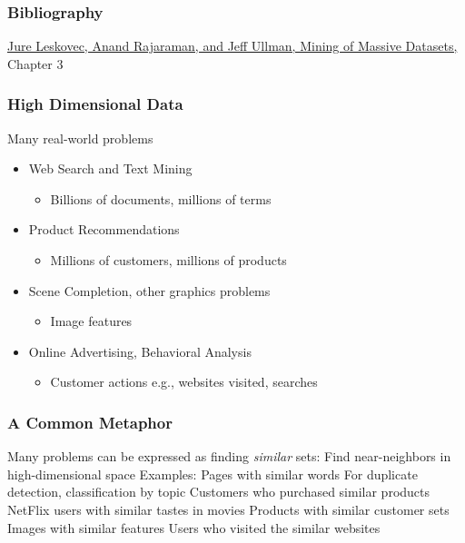 \documentclass[svgnames]{beamer}
\subtitle{Similarity Search}
\begin{document}
\maketitle
\makeoutline

\begin{frame}
    \frametitle{Bibliography}
    \href{http://www.mmds.org}{Jure Leskovec, Anand Rajaraman, and Jeff Ullman, Mining of Massive Datasets,} Chapter 3
\end{frame}

\begin{frame} \frametitle{High Dimensional Data}
Many real-world problems
\begin{itemize}
\item Web Search and Text Mining
  \begin{itemize}
  \item Billions of documents, millions of terms
  \end{itemize}
\item Product Recommendations
  \begin{itemize}
  \item Millions of customers, millions of products
  \end{itemize}
\item Scene Completion, other graphics problems
  \begin{itemize}
  \item Image features
  \end{itemize}
\item Online Advertising, Behavioral Analysis
  \begin{itemize}
  \item Customer actions e.g., websites visited, searches
  \end{itemize}
\end{itemize}
\end{frame}

  
\begin{frame} \frametitle{A Common Metaphor}

Many problems can be expressed as finding \emph{similar} sets:
Find near-neighbors in high-dimensional space
Examples:
  Pages with similar words
    For duplicate detection, classification by topic
  Customers who purchased similar products
    NetFlix users with similar tastes in movies
	Products with similar customer sets
  Images with similar features
  Users who visited the similar websites

\end{frame}
\end{document}
